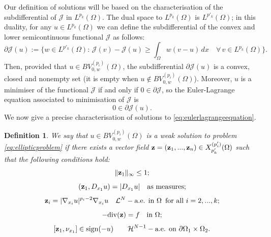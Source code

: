 \documentclass[reqno,12pt]{amsart}
\def\z{{\bf z}}
\newtheorem{definition}[theorem]{Definition}
\numberwithin{equation}{section}
\begin{document}
Our definition of solutions will be based on the characterisation of the subdifferential of $\mathcal{J}$ in $L^{p_k}(\Omega)$. The dual space to $L^{p_k}(\Omega)$ is $L^{p'_k}(\Omega)$; in this duality, for any $u \in L^{p_k}(\Omega)$ we can define the subdifferential of the convex and lower semicontinuous functional $\mathcal{J}$ as follows:
\begin{equation*}
\partial \mathcal{J}(u) := \bigg\{ w \in L^{p'_k}(\Omega): \, \mathcal{J}(v) - \mathcal{J}(u) \geq \int_\Omega w (v - u) \, dx \quad  \forall \, v \in L^{p_k}(\Omega) \bigg\}.
\end{equation*}
Then, provided that $u \in BV_{0,w}^{(p_i)}(\Omega)$, the subdifferential $\partial\mathcal{J}(u)$ is a convex, closed and nonempty set (it is empty when $u \notin BV_{0,w}^{(p_i)}(\Omega)$). Moreover, $u$ is a minimiser of the functional $\mathcal{J}$ if and only if $0 \in \partial\mathcal{J}$, so the Euler-Lagrange equation associated to minimisation of $\mathcal{J}$ is
\begin{equation}\label{eq:eulerlagrangeequation}
0 \in \partial\mathcal{J}(u).
\end{equation}
We now give a precise characterisation of solutions to \eqref{eq:eulerlagrangeequation}.

\begin{definition}\label{dfn:solutionsellipticproblem}
We say that $u \in BV_{0,w}^{(p_i)}(\Omega)$ is a weak solution to problem \eqref{eq:ellipticproblem} if there exists a vector field $\z = (\z_1, ..., \z_n) \in X^{(p'_i)}_{p'_k}(\Omega)$ such that the following conditions hold:
\begin{equation}\label{eq:ellipticbound}
\| \z_1 \|_\infty \leq 1;
\end{equation}
\begin{equation}\label{eq:ellipticconditionforpairing}
(\z_1, D_{x_1} u) = |D_{x_1} u| \quad \hbox{\rm as measures};
\end{equation}
\begin{equation}\label{eq:ellipticconditiononzi}
\z_i = |\nabla_{x_i} u|^{p_i - 2} \nabla_{x_i} u \quad \mathcal{L}^N-\hbox{\rm a.e. in } \Omega \,\,\, \hbox{\rm for all } i = 2,...,k;
\end{equation}
\begin{equation}\label{eq:ellipticconditionfordivergence}
-\mathrm{div}(\z) = f \quad \hbox{\rm in} \ \Omega;
\end{equation}
\begin{equation}\label{eq:ellipticboundarycondition}
[\z_1, \nu_{x_1}] \in \mathrm{sign}(-u) \qquad  \mathcal{H}^{N-1}-\mbox{\rm a.e.  on} \ \partial \Omega_1 \times \Omega_2.
\end{equation}
\end{definition}
\end{document}
